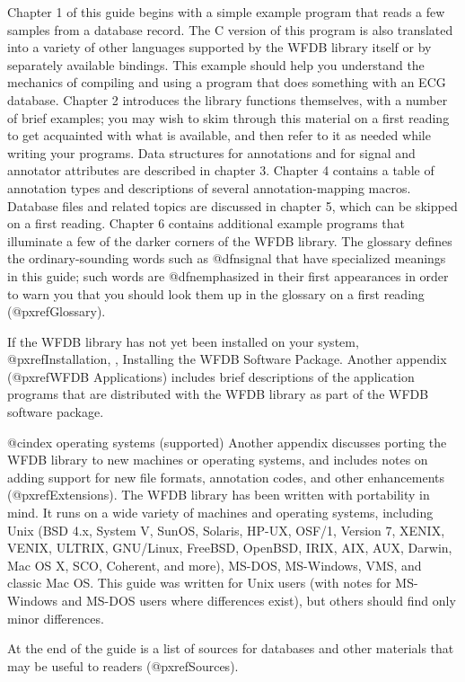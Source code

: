 Chapter 1 of this guide begins with a simple example program that reads a few
samples from a database record.  The C version of this program is also
translated into a variety of other languages supported by the WFDB library
itself or by separately available bindings.  This example should help you
understand the mechanics of compiling and using a program that does something
with an ECG database.  Chapter 2 introduces the library functions themselves,
with a number of brief examples; you may wish to skim through this material on
a first reading to get acquainted with what is available, and then refer to it
as needed while writing your programs.  Data structures for annotations and for
signal and annotator attributes are described in chapter 3.  Chapter 4 contains
a table of annotation types and descriptions of several annotation-mapping
macros.  Database files and related topics are discussed in chapter 5, which
can be skipped on a first reading.  Chapter 6 contains additional example
programs that illuminate a few of the darker corners of the WFDB library.  The
glossary defines the ordinary-sounding words such as @dfn{signal} that have
specialized meanings in this guide; such words are @dfn{emphasized} in their
first appearances in order to warn you that you should look them up in the
glossary on a first reading (@pxref{Glossary}).

If the WFDB library has not yet been installed on your system,
@pxref{Installation, , Installing the WFDB Software Package}.
Another appendix (@pxref{WFDB Applications}) includes brief
descriptions of the application programs that are distributed with the
WFDB library as part of the WFDB software package.

@cindex operating systems (supported)
Another appendix discusses porting the WFDB library to new machines or
operating systems, and includes notes on adding support for new file
formats, annotation codes, and other enhancements (@pxref{Extensions}).
The WFDB library has been written with portability in mind.  It runs on
a wide variety of machines and operating systems, including Unix (BSD
4.x, System V, SunOS, Solaris, HP-UX, OSF/1, Version 7, XENIX, VENIX,
ULTRIX, GNU/Linux, FreeBSD, OpenBSD, IRIX, AIX, AUX, Darwin, Mac OS X, SCO,
Coherent, and more), MS-DOS, MS-Windows, VMS, and classic Mac OS.
This guide was written for Unix users (with notes for MS-Windows and
MS-DOS users where differences exist), but others should find only minor
differences.

At the end of the guide is a list of sources for databases and other
materials that may be useful to readers (@pxref{Sources}).

